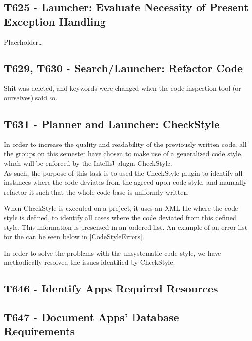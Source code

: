 \subsection{T625 - Launcher: Evaluate Necessity of Present Exception Handling}
Placeholder\ldots

\subsection{T629, T630 - Search/Launcher: Refactor Code}
Shit was deleted, and keywords were changed when the code inspection tool (or
ourselves) said so.

\subsection{T631 - Planner and Launcher: CheckStyle}
In order to increase the quality and readability of the previously written code,
all the groups on this semester have chosen to make use of a generalized code
style, which will be enforced by the IntelliJ plugin CheckStyle.\\
As such, the purpose of this task is to used the CheckStyle plugin to identify
all instances where the code deviates from the agreed upon code style, and
manually refactor it such that the whole code base is uniformly written.\nl

When CheckStyle is executed on a project, it uses an XML file where the code
style is defined, to identify all cases where the code deviated from this
defined style. This information is presented in an ordered list. An example of
an error-list for the  can be seen below in
\autoref{CodeStyleErrors}.


In order to solve the problems with the unsystematic code style, we have
methodically resolved the issues identified by CheckStyle.

\subsection{T646 - Identify Apps Required Resources}

\subsection{T647 - Document Apps' Database Requirements}

